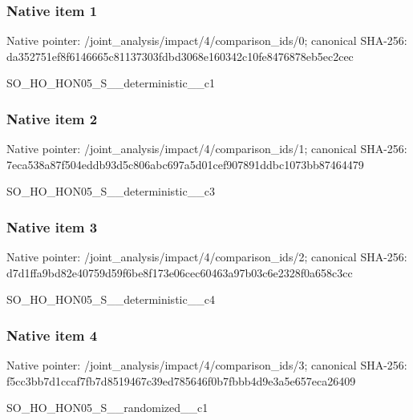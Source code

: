 \documentclass[10pt,a4paper]{article}
\begin{document}
\subsubsection{Native item 1}
Native pointer: /joint\_\allowbreak{}analysis/impact/4/comparison\_\allowbreak{}ids/0; canonical SHA-256: da352751ef8f6146665c81137303fdbd3068e160342c10fe8476878eb5ec2cec

\begingroup\raggedright\sloppy SO\_\allowbreak{}HO\_\allowbreak{}HON05\_\allowbreak{}S\_\allowbreak{}\_\allowbreak{}deterministic\_\allowbreak{}\_\allowbreak{}c1\par\endgroup

\subsubsection{Native item 2}
Native pointer: /joint\_\allowbreak{}analysis/impact/4/comparison\_\allowbreak{}ids/1; canonical SHA-256: 7eca538a87f504eddb93d5c806abc697a5d01cef907891ddbc1073bb87464479

\begingroup\raggedright\sloppy SO\_\allowbreak{}HO\_\allowbreak{}HON05\_\allowbreak{}S\_\allowbreak{}\_\allowbreak{}deterministic\_\allowbreak{}\_\allowbreak{}c3\par\endgroup

\subsubsection{Native item 3}
Native pointer: /joint\_\allowbreak{}analysis/impact/4/comparison\_\allowbreak{}ids/2; canonical SHA-256: d7d1ffa9bd82e40759d59f6be8f173e06cec60463a97b03c6e2328f0a658c3cc

\begingroup\raggedright\sloppy SO\_\allowbreak{}HO\_\allowbreak{}HON05\_\allowbreak{}S\_\allowbreak{}\_\allowbreak{}deterministic\_\allowbreak{}\_\allowbreak{}c4\par\endgroup

\subsubsection{Native item 4}
Native pointer: /joint\_\allowbreak{}analysis/impact/4/comparison\_\allowbreak{}ids/3; canonical SHA-256: f5cc3bb7d1ccaf7fb7d8519467c39ed785646f0b7fbbb4d9e3a5e657eca26409

\begingroup\raggedright\sloppy SO\_\allowbreak{}HO\_\allowbreak{}HON05\_\allowbreak{}S\_\allowbreak{}\_\allowbreak{}randomized\_\allowbreak{}\_\allowbreak{}c1\par\endgroup
\end{document}
